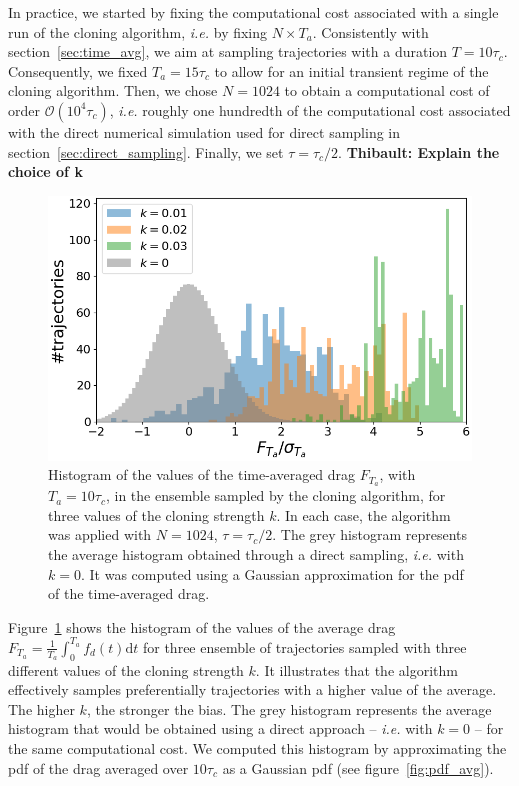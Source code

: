 \documentclass{jfm}
\begin{document}
In practice, we started by fixing the computational cost associated with a single run of the cloning algorithm, \textit{i.e.} by fixing $N \times T_a$.
Consistently with section~\ref{sec:time_avg}, we aim at sampling trajectories with a duration $T = 10\tau_c$.
Consequently, we fixed $T_a = 15\tau_c$ to allow for an initial transient regime of the cloning algorithm.
Then, we chose $N = 1024$ to obtain a computational cost of order $\mathcal{O}(10^4 \tau_c)$, \textit{i.e.} roughly one hundredth of the computational cost associated with the direct numerical simulation used for direct sampling in section~\ref{sec:direct_sampling}.
Finally, we set $\tau = \tau_c / 2$.
\textbf{Thibault: Explain the choice of k}

\begin{figure}
  \centering
  \includegraphics[width=.7\linewidth]{IS_GKTL/IS_GKTL_2}
  \caption{Histogram of the values of the time-averaged drag $F_{T_a}$, with $T_a = 10\tau_c$, in the ensemble sampled by the cloning algorithm, for three values of the cloning strength $k$. In each case, the algorithm was applied with $N=1024$, $\tau = \tau_c / 2$. The grey histogram represents the average histogram obtained through a direct sampling, \textit{i.e.} with $k=0$. It was computed using a Gaussian approximation for the \ac{pdf} of the time-averaged drag.}
  \label{fig:IS_GKTL}
\end{figure}
Figure~\ref{fig:IS_GKTL} shows the histogram of the values of the average drag $F_{T_a} = \frac{1}{T_a}\int_{0}^{T_a}f_d(t)\mathrm{d}t$ for three ensemble of trajectories sampled with three different values of the cloning strength $k$.
It illustrates that the algorithm effectively samples preferentially trajectories with a higher value of the average.
The higher $k$, the stronger the bias.
The grey histogram represents the average histogram that would be obtained using a direct approach -- \textit{i.e.} with $k=0$ -- for the same computational cost.
We computed this histogram by approximating the \ac{pdf} of the drag averaged over $10\tau_c$ as a Gaussian \ac{pdf} (see figure~\ref{fig:pdf_avg}).
\end{document}
